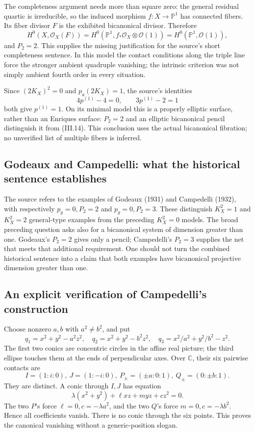 The completeness argument needs more than square zero: the general residual quartic is irreducible, so the induced morphism \(f:X\to\mathbb{P}^1\) has connected fibers. Its fiber divisor \(F\) is the exhibited bicanonical divisor. Therefore \[
H^0(X,\mathcal O_X(F))
=H^0(\mathbb{P}^1,f_*\mathcal O_X\otimes\mathcal O(1))
=H^0(\mathbb{P}^1,\mathcal O(1)),
\] and \(P_2=2\). This supplies the missing justification for the source's short completeness sentence. In this model the contact conditions along the triple line force the stronger ambient quadruple vanishing; the intrinsic criterion was not simply ambient fourth order in every situation.

Since \((2K_X)^2=0\) and \(p_a(2K_X)=1\), the source's identities \[
4p^{(1)}-4=0,\qquad 3p^{(1)}-2=1
\] both give \(p^{(1)}=1\). On its minimal model this is a properly elliptic surface, rather than an Enriques surface: \(P_2=2\) and an elliptic bicanonical pencil distinguish it from (III.14). This conclusion uses the actual bicanonical fibration; no unverified list of multiple fibers is inferred.

\subsection{Godeaux and Campedelli: what the historical sentence establishes}

The source refers to the examples of Godeaux (1931) and Campedelli (1932), with respectively \(p_g=0,P_2=2\) and \(p_g=0,P_2=3\). These distinguish \(K_X^2=1\) and \(K_X^2=2\) general-type examples from the preceding \(K_X^2=0\) models. The broad preceding question asks also for a bicanonical system of dimension greater than one. Godeaux's \(P_2=2\) gives only a pencil; Campedelli's \(P_2=3\) supplies the net that meets that additional requirement. One should not turn the combined historical sentence into a claim that both examples have bicanonical projective dimension greater than one.

\subsection{An explicit verification of Campedelli's construction}

Choose nonzero \(a,b\) with \(a^2\ne b^2\), and put \[
q_1=x^2+y^2-a^2z^2,\quad
q_2=x^2+y^2-b^2z^2,\quad
q_3=x^2/a^2+y^2/b^2-z^2.
\] The first two conics are concentric circles in the affine real picture; the third ellipse touches them at the ends of perpendicular axes. Over \(\mathbb{C}\), their six pairwise contacts are \[
I=(1:i:0),\ J=(1:-i:0),\
P_\pm=(\pm a:0:1),\
Q_\pm=(0:\pm b:1).
\] They are distinct. A conic through \(I,J\) has equation \[
\lambda(x^2+y^2)+\ell xz+myz+cz^2=0.
\] The two \(P\)'s force \(\ell=0,c=-\lambda a^2\), and the two \(Q\)'s force \(m=0,c=-\lambda b^2\). Hence all coefficients vanish. There is no conic through the six points. This proves the canonical vanishing without a generic-position slogan.

